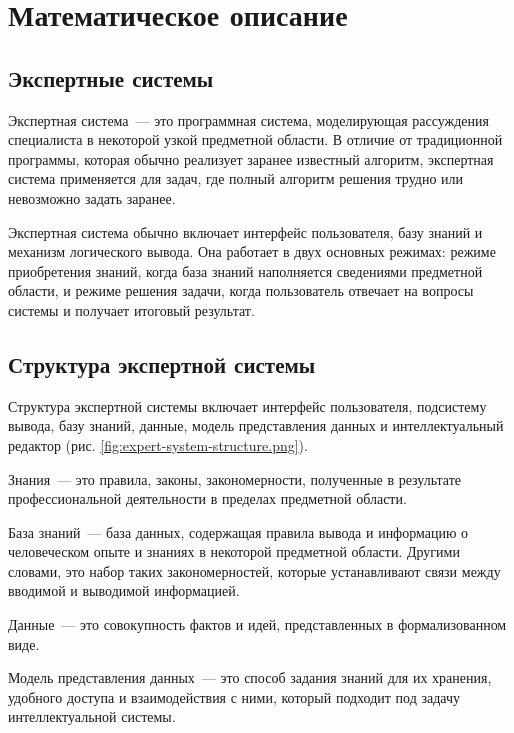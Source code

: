 \section{Математическое описание}

\subsection{Экспертные системы}

Экспертная система~--- это программная система, моделирующая рассуждения специалиста в некоторой узкой предметной области. В отличие от традиционной программы, которая обычно реализует заранее известный алгоритм, экспертная система применяется для задач, где полный алгоритм решения трудно или невозможно задать заранее.

Экспертная система обычно включает интерфейс пользователя, базу знаний и механизм логического вывода. Она работает в двух основных режимах: режиме приобретения знаний, когда база знаний наполняется сведениями предметной области, и режиме решения задачи, когда пользователь отвечает на вопросы системы и получает итоговый результат.

\subsection{Структура экспертной системы}

Структура экспертной системы включает интерфейс пользователя, подсистему вывода, базу знаний, данные, модель представления данных и интеллектуальный редактор (рис. \ref{fig:expert-system-structure.png}).


Знания~--- это правила, законы, закономерности, полученные в результате профессиональной деятельности в пределах предметной области.

База знаний~--- база данных, содержащая правила вывода и информацию о человеческом опыте и знаниях в некоторой предметной области. Другими словами, это набор таких закономерностей, которые устанавливают связи между вводимой и выводимой информацией.

Данные~--- это совокупность фактов и идей, представленных в формализованном виде.

Модель представления данных~--- это способ задания знаний для их хранения, удобного доступа и взаимодействия с ними, который подходит под задачу интеллектуальной системы.

